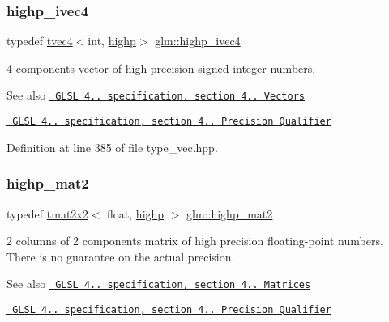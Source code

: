 \subsubsection{\texorpdfstring{highp\_ivec4}{highp\_ivec4}}
{\footnotesize\ttfamily typedef \mbox{\hyperlink{structglm_1_1tvec4}{tvec4}}$<$int, \mbox{\hyperlink{namespaceglm_a0f04f086094c747d227af4425893f545ac6f7eab42eacbb10d59a58e95e362074}{highp}}$>$ \mbox{\hyperlink{group__core__precision_ga9303c2a9e1f1e761961eeecbcda2d34f}{glm\+::highp\+\_\+ivec4}}}

4 components vector of high precision signed integer numbers.

\begin{DoxySeeAlso}{See also}
\href{http://www.opengl.org/registry/doc/GLSLangSpec.4.20.8.pdf}{\texttt{ G\+L\+SL 4.. specification, section 4.. Vectors}} 

\href{http://www.opengl.org/registry/doc/GLSLangSpec.4.20.8.pdf}{\texttt{ G\+L\+SL 4.. specification, section 4.. Precision Qualifier}} 
\end{DoxySeeAlso}


Definition at line 385 of file type\+\_\+vec.\+hpp.

\mbox{\label{group__core__precision_ga8539ada9351e0a74964fa23c040246cf}} 
\subsubsection{\texorpdfstring{highp\_mat2}{highp\_mat2}}
{\footnotesize\ttfamily typedef \mbox{\hyperlink{structglm_1_1tmat2x2}{tmat2x2}}$<$ float, \mbox{\hyperlink{namespaceglm_a0f04f086094c747d227af4425893f545ac6f7eab42eacbb10d59a58e95e362074}{highp}} $>$ \mbox{\hyperlink{group__core__precision_ga8539ada9351e0a74964fa23c040246cf}{glm\+::highp\+\_\+mat2}}}

2 columns of 2 components matrix of high precision floating-\/point numbers. There is no guarantee on the actual precision.

\begin{DoxySeeAlso}{See also}
\href{http://www.opengl.org/registry/doc/GLSLangSpec.4.20.8.pdf}{\texttt{ G\+L\+SL 4.. specification, section 4.. Matrices}} 

\href{http://www.opengl.org/registry/doc/GLSLangSpec.4.20.8.pdf}{\texttt{ G\+L\+SL 4.. specification, section 4.. Precision Qualifier}} 
\end{DoxySeeAlso}


